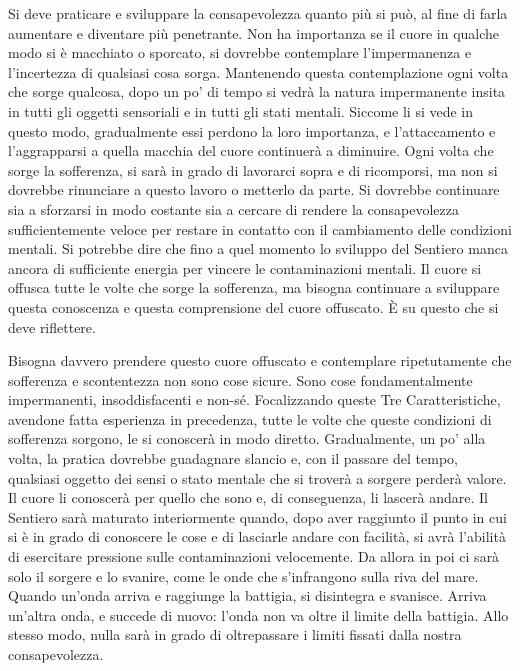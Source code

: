 Si deve praticare e sviluppare la consapevolezza quanto più si può, al
fine di farla aumentare e diventare più penetrante. Non ha importanza se
il cuore in qualche modo si è macchiato o sporcato, si dovrebbe
contemplare l'impermanenza e l'incertezza di qualsiasi cosa sorga.
Mantenendo questa contemplazione ogni volta che sorge qualcosa, dopo un
po' di tempo si vedrà la natura impermanente insita in tutti gli oggetti
sensoriali e in tutti gli stati mentali. Siccome li si vede in questo
modo, gradualmente essi perdono la loro importanza, e l'attaccamento e
l'aggrapparsi a quella macchia del cuore continuerà a diminuire. Ogni
volta che sorge la sofferenza, si sarà in grado di lavorarci sopra e di
ricomporsi, ma non si dovrebbe rinunciare a questo lavoro o metterlo da
parte. Si dovrebbe continuare sia a sforzarsi in modo costante sia a
cercare di rendere la consapevolezza sufficientemente veloce per restare
in contatto con il cambiamento delle condizioni mentali. Si potrebbe
dire che fino a quel momento lo sviluppo del Sentiero manca ancora di
sufficiente energia per vincere le contaminazioni mentali. Il cuore si
offusca tutte le volte che sorge la sofferenza, ma bisogna continuare a
sviluppare questa conoscenza e questa comprensione del cuore offuscato.
È su questo che si deve riflettere.

Bisogna davvero prendere questo cuore offuscato e contemplare
ripetutamente che sofferenza e scontentezza non sono cose sicure. Sono
cose fondamentalmente impermanenti, insoddisfacenti e non-sé.
Focalizzando queste Tre Caratteristiche, avendone fatta esperienza in
precedenza, tutte le volte che queste condizioni di sofferenza sorgono,
le si conoscerà in modo diretto. Gradualmente, un po' alla volta, la
pratica dovrebbe guadagnare slancio e, con il passare del tempo,
qualsiasi oggetto dei sensi o stato mentale che si troverà a sorgere
perderà valore. Il cuore li conoscerà per quello che sono e, di
conseguenza, li lascerà andare. Il Sentiero sarà maturato interiormente
quando, dopo aver raggiunto il punto in cui si è in grado di conoscere
le cose e di lasciarle andare con facilità, si avrà l'abilità di
esercitare pressione sulle contaminazioni velocemente. Da allora in poi
ci sarà solo il sorgere e lo svanire, come le onde che s'infrangono
sulla riva del mare. Quando un'onda arriva e raggiunge la battigia, si
disintegra e svanisce. Arriva un'altra onda, e succede di nuovo: l'onda
non va oltre il limite della battigia. Allo stesso modo, nulla sarà in
grado di oltrepassare i limiti fissati dalla nostra consapevolezza.

